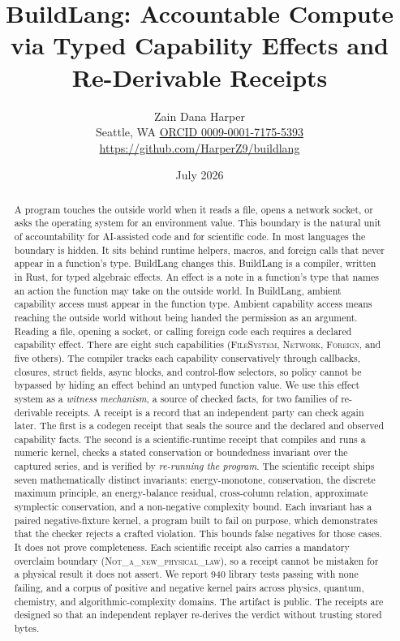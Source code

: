 \documentclass[11pt]{article}
\title{\textbf{BuildLang: Accountable Compute via Typed Capability Effects and Re-Derivable Receipts}}
\author{Zain Dana Harper\\[2pt]\small Seattle, WA \quad\textbar\quad \href{https://orcid.org/0009-0001-7175-5393}{ORCID 0009-0001-7175-5393}\\[2pt]\small\url{https://github.com/HarperZ9/buildlang}}
\date{July 2026}
\begin{document}
\maketitle

\begin{abstract}
A program touches the outside world when it reads a file, opens a network socket, or asks the operating system for an environment value. This boundary is the natural unit of accountability for AI-assisted code and for scientific code. In most languages the boundary is hidden. It sits behind runtime helpers, macros, and foreign calls that never appear in a function's type. BuildLang changes this. BuildLang is a compiler, written in Rust, for typed algebraic effects. An effect is a note in a function's type that names an action the function may take on the outside world. In BuildLang, ambient capability access must appear in the function type. Ambient capability access means reaching the outside world without being handed the permission as an argument. Reading a file, opening a socket, or calling foreign code each requires a declared capability effect. There are eight such capabilities (\textsc{FileSystem}, \textsc{Network}, \textsc{Foreign}, and five others). The compiler tracks each capability conservatively through callbacks, closures, struct fields, async blocks, and control-flow selectors, so policy cannot be bypassed by hiding an effect behind an untyped function value. We use this effect system as a \emph{witness mechanism}, a source of checked facts, for two families of re-derivable receipts. A receipt is a record that an independent party can check again later. The first is a codegen receipt that seals the source and the declared and observed capability facts. The second is a scientific-runtime receipt that compiles and runs a numeric kernel, checks a stated conservation or boundedness invariant over the captured series, and is verified by \emph{re-running the program}. The scientific receipt ships seven mathematically distinct invariants: energy-monotone, conservation, the discrete maximum principle, an energy-balance residual, cross-column relation, approximate symplectic conservation, and a non-negative complexity bound. Each invariant has a paired negative-fixture kernel, a program built to fail on purpose, which demonstrates that the checker rejects a crafted violation. This bounds false negatives for those cases. It does not prove completeness. Each scientific receipt also carries a mandatory overclaim boundary (\textsc{Not\_a\_new\_physical\_law}), so a receipt cannot be mistaken for a physical result it does not assert. We report 940 library tests passing with none failing, and a corpus of positive and negative kernel pairs across physics, quantum, chemistry, and algorithmic-complexity domains. The artifact is public. The receipts are designed so that an independent replayer re-derives the verdict without trusting stored bytes.
\end{abstract}
\end{document}
